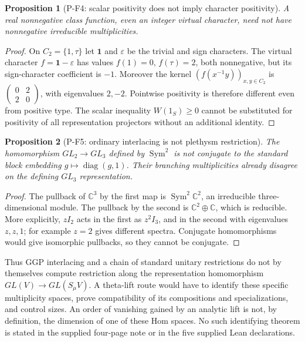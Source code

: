 \documentclass[11pt,a4paper]{article}
\newtheorem{proposition}{Proposition}[section]
\begin{document}
\begin{proposition}[P-F4: scalar positivity does not imply character positivity]
\label{prop:scalar}
A real nonnegative class function, even an integer virtual character,
need not have nonnegative irreducible multiplicities.
\end{proposition}
\begin{proof}
On $C_2=\{1,\tau\}$ let $\mathbf1$ and $\varepsilon$ be the trivial
and sign characters. The virtual character
$f=\mathbf1-\varepsilon$ has values $f(1)=0$, $f(\tau)=2$,
both nonnegative, but its sign-character coefficient is $-1$.
Moreover the kernel $(f(x^{-1}y))_{x,y\in C_2}$ is
$\left(\begin{smallmatrix}0&2\\2&0\end{smallmatrix}\right)$,
with eigenvalues $2,-2$. Pointwise positivity is therefore different
even from positive type. The scalar inequality $W(1_S)\ge0$ cannot
be substituted for positivity of all representation projectors without
an additional identity.
\end{proof}

\begin{proposition}[P-F5: ordinary interlacing is not plethysm restriction]
\label{prop:interlacing}
The homomorphism $GL_2\to GL_3$ defined by $\operatorname{Sym}^2$
is not conjugate to the standard block embedding
$g\mapsto\operatorname{diag}(g,1)$. Their branching multiplicities
already disagree on the defining $GL_3$ representation.
\end{proposition}
\begin{proof}
The pullback of $\mathbb C^3$ by the first map is
$\operatorname{Sym}^2\mathbb C^2$, an irreducible three-dimensional
module. The pullback by the second is $\mathbb C^2\oplus\mathbb C$,
which is reducible. More explicitly, $zI_2$ acts in the first as $z^2I_3$,
and in the second with eigenvalues $z,z,1$; for example $z=2$ gives
different spectra. Conjugate homomorphisms would give isomorphic pullbacks,
so they cannot be conjugate.
\end{proof}

Thus GGP interlacing and a chain of standard unitary restrictions do not
by themselves compute restriction along the representation homomorphism
$GL(V)\to GL(S_\mu V)$. A theta-lift route would have to identify these
specific multiplicity spaces, prove compatibility of its compositions
and specializations, and control sizes. An order of vanishing gained
by an analytic lift is not, by definition, the dimension of one of
these Hom spaces. No such identifying theorem is stated in the supplied
four-page note or in the five supplied Lean declarations.
\end{document}
